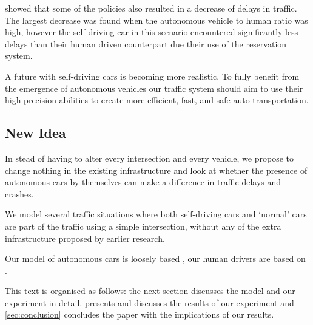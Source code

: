 \textcite{dresner2007sharing} showed that some of the policies also resulted in a decrease of delays in traffic. The largest decrease was found when the autonomous vehicle to human ratio was high, however the self-driving car in this scenario encountered significantly less delays than their human driven counterpart due their use of the reservation system.

A future with self-driving cars is becoming more realistic. To fully benefit from the emergence of autonomous vehicles our traffic system should aim to use their high-precision abilities to create more efficient, fast, and safe auto transportation.


\subsection{New Idea}
\label{sub:intro:new_idea}	
In stead of having to alter every intersection and every vehicle, we propose to change nothing in the existing infrastructure and look at whether the presence of autonomous cars by themselves can make a difference in traffic delays and crashes. 

We model several traffic situations where both self-driving cars and `normal' cars are part of the traffic using a simple intersection, without any of the extra infrastructure proposed by earlier research. 


Our model of autonomous cars is loosely based \textcite{jiang2010microscopic}, our human drivers are based on \textcite{paruchuri2002multi}.

This text is organised as follows: the next section discusses the model and our experiment in detail.  presents and discusses the results of our experiment and \cref{sec:conclusion} concludes the paper with the implications of our results.